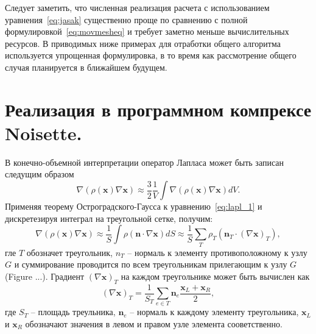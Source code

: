 Следует заметить, что численная реализация расчета с использованием уравнения~\eqref{eq:jasak} существенно проще по сравнению с полной формулировкой~\eqref{eq:movmesheq} и требует заметно меньше вычислительных ресурсов. В приводимых ниже примерах для отработки общего алгоритма  используется упрощенная формулировка, в то время как рассмотрение общего случая планируется в ближайшем будущем.

\section{Реализация в программном компрексе Noisette.}

В конечно-объемной интерпретации оператор Лапласа может быть записан следущим образом
\begin{equation}
\nabla(\rho(\mathbf{x}) \nabla \mathbf{x})\approx \frac{3}{2}\frac{1}{V}\int \nabla(\rho(\mathbf{x}) \nabla \mathbf{x}) dV.
\label{eq:lapl_1}
\end{equation}
Применяя теорему Остроградского-Гаусса к уравнению~\eqref{eq:lapl_1} и дискретезируя интеграл на треугольной сетке, получим:
\begin{equation}
\nabla(\rho(\mathbf{x}) \nabla \mathbf{x})\approx \frac{1}{S}\int \rho (\mathbf{n}\cdot \nabla \mathbf{x})dS
\approx \frac{1}{S}\sum_{T} \rho_T (\mathbf{n}_T\cdot(\nabla \mathbf{x})_T) ,
\end{equation}
гле $T$ обозначет треугольник, $n_T$ -- нормаль к элементу противоположному к узлу $G$ и суммирование проводится по всем треугольникам прилегающим к узлу $G$ (Figure ...).
Градиент $(\nabla \mathbf{x})_T$ на каждом треугольнике может быть вычислен как 
\begin{equation}
(\nabla \mathbf{x})_T = \frac{1}{S_T}\sum_{e\in T}\mathbf{n}_e \frac{\mathbf{x}_L+\mathbf{x}_R}{2},
\label{eq:gradient}
\end{equation}
где $S_T$ -- площадь треульника, $\mathbf{n}_e$  -- нормаль к каждому элементу треугольника, $\mathbf{x}_L$ и $\mathbf{x}_R$ обозначают значения в левом и правом узле элемента сооветственно.

